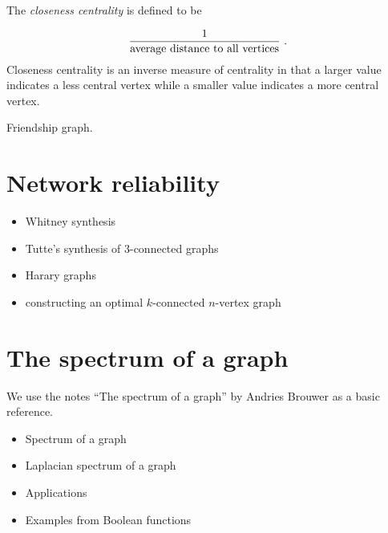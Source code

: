 The {\it closeness centrality} is defined to be 

\[
       \frac{1}{{\rm average\ distance\ to\ all\ vertices}}\ .
\]
Closeness centrality is an inverse measure of centrality in that a
larger value indicates a less
central vertex while a smaller value indicates a more central vertex.

\begin{algorithm}[!htbp]

\caption{Friendship graph.}
\label{alg:distance_connectivity:friendship_graphs}
\end{algorithm}



\section{Network reliability}

\begin{itemize}
\item Whitney synthesis

\item Tutte's synthesis of $3$-connected graphs

\item Harary graphs

\item constructing an optimal $k$-connected $n$-vertex graph
\end{itemize}


\section{The spectrum of a graph}

We use the notes ``The spectrum of a graph'' by
Andries Brouwer \cite{Brouwer} as a basic reference.

\begin{itemize}

\item
Spectrum of a graph

\item
Laplacian spectrum of a graph

\item
Applications

\item
Examples from Boolean functions
\end{itemize}


